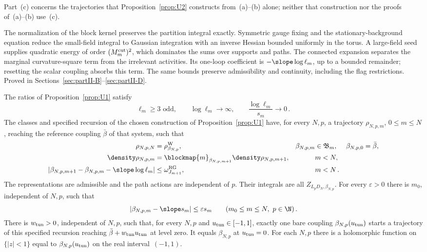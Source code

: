 Part~\textup{(c)} concerns the trajectories that Proposition~\ref{prop:U2} constructs from~\textup{(a)}--\textup{(b)} alone; neither that construction nor the proofs of~\textup{(a)}--\textup{(b)} use~\textup{(c)}.

The normalization of the block kernel preserves the partition integral exactly.
Symmetric gauge fixing and the stationary-background equation reduce the
small-field integral to Gaussian integration with an inverse Hessian bounded
uniformly in the torus. A large-field seed supplies quadratic energy of order
$(M_m^{\rm cut})^2$, which dominates the sums over supports and paths. The
connected expansion separates the marginal curvature-square term from the
irrelevant activities. Its one-loop coefficient is
$-\slope\log\ell_m$, up to a bounded remainder; resetting the scalar coupling
absorbs this term. The same bounds preserve admissibility and continuity,
including the flag restrictions. Proved in
Sections~\ref{sec:partII-B}--\ref{sec:partII-D}.

\begin{proposition}\label{prop:U2}
The ratios of Proposition~\ref{prop:U1} satisfy
\begin{equation}\label{eq:U2-1}
\ell_m\ge3\text{ odd},\qquad\log\ell_m\to\infty,\qquad \frac{\log\ell_m}{s_m}\to0\,.
\end{equation}
The classes and specified recursion of the chosen construction of Proposition~\ref{prop:U1} have, for every $N,p$, a trajectory $\rho_{N,p,m}$, $0\le m\le N$, reaching the reference coupling $\bar\beta$ of that system, such that
\begin{equation}\label{eq:U2-2}
\begin{aligned}
\rho_{N,p,N}&=\rho^{\rm W}_{\beta_{N,p}},&\beta_{N,p,m}&\in\mathfrak B_m,&\beta_{N,p,0}&=\bar\beta,\\
\density\rho_{N,p,m}&=\blockmap{m}_{\beta_{N,p,m+1}}\density\rho_{N,p,m+1},&&m<N,\\
|\beta_{N,p,m+1}-\beta_{N,p,m}-\slope\log\ell_m|&\le\omega^{\rm RG}_{J_{m+1}},&&m<N\,.
\end{aligned}
\end{equation}
The representations are admissible and the path actions are independent of $p$. Their integrals are all $Z_{L_pD_N,\beta_{N,p}}$. For every $\varepsilon>0$ there is $m_0$, independent of $N,p$, such that
\begin{equation}\label{eq:U2-3}
|\beta_{N,p,m}-\slope s_m|\le\varepsilon s_m\qquad(m_0\le m\le N,\ p\in\N)\,.
\end{equation}
There is $w_{\rm tun}>0$, independent of $N,p$, such that, for every $N,p$ and $u_{\rm tun}\in[-1,1]$, exactly one bare coupling $\beta_{N,p}(u_{\rm tun})$ starts a trajectory of this specified recursion reaching $\bar\beta+w_{\rm tun}u_{\rm tun}$ at level zero. It equals $\beta_{N,p}$ at $u_{\rm tun}=0$. For each $N,p$ there is a holomorphic function on $\{|z|<1\}$ equal to $\beta_{N,p}(u_{\rm tun})$ on the real interval~$(-1,1)$.
\end{proposition}

